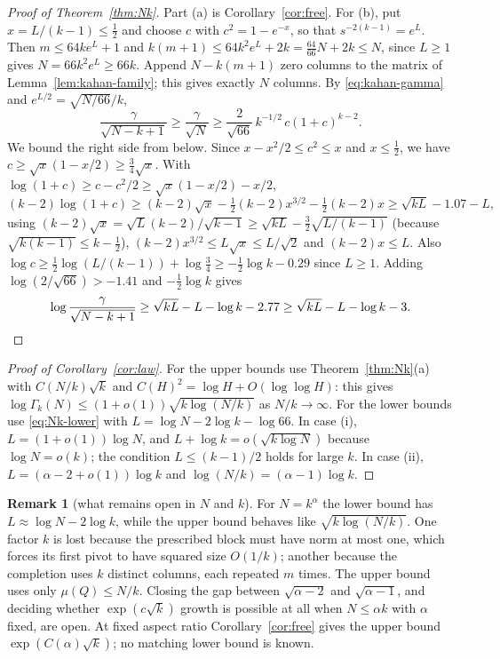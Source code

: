 \documentclass[11pt,a4paper]{article}
\theoremstyle{definition}
\newtheorem{remark}[theorem]{Remark}
\numberwithin{equation}{section}
\begin{document}
\begin{proof}[Proof of Theorem~\ref{thm:Nk}]
Part (a) is Corollary~\ref{cor:free}. For (b), put $x=L/(k-1)\le\tfrac12$ and choose $c$ with $c^2=1-e^{-x}$, so that
$s^{-2(k-1)}=e^L$. Then $m\le64ke^L+1$ and $k(m+1)\le64k^2e^L+2k=\tfrac{64}{66}N+2k\le N$, since $L\ge1$ gives $N=66k^2e^L\ge66k$. Append
$N-k(m+1)$ zero columns to the matrix of Lemma~\ref{lem:kahan-family}; this gives exactly $N$ columns. By
\eqref{eq:kahan-gamma} and $e^{L/2}=\sqrt{N/66}/k$,
\begin{equation}\label{eq:Nk-ratio}
 \frac{\gamma}{\sqrt{N-k+1}}\ge\frac{\gamma}{\sqrt N}\ge\frac2{\sqrt{66}}\,k^{-1/2}\,c(1+c)^{k-2}.
\end{equation}
We bound the right side from below. Since $x-x^2/2\le c^2\le x$ and $x\le\tfrac12$, we have
$c\ge\sqrt x(1-x/2)\ge\tfrac34\sqrt x$. With $\log(1+c)\ge c-c^2/2\ge\sqrt x(1-x/2)-x/2$,
\[
 (k-2)\log(1+c)\ge(k-2)\sqrt x-\tfrac12(k-2)x^{3/2}-\tfrac12(k-2)x\ge\sqrt{kL}-1.07-L,
\]
using $(k-2)\sqrt x=\sqrt L(k-2)/\sqrt{k-1}\ge\sqrt{kL}-\tfrac32\sqrt{L/(k-1)}$ (because $\sqrt{k(k-1)}\le k-\tfrac12$),
$(k-2)x^{3/2}\le L\sqrt x\le L/\sqrt2$ and $(k-2)x\le L$. Also $\log c\ge\tfrac12\log(L/(k-1))+\log\tfrac34
\ge-\tfrac12\log k-0.29$ since $L\ge1$. Adding $\log(2/\sqrt{66})>-1.41$ and $-\tfrac12\log k$ gives
\begin{equation}\label{eq:Nk-ineq}
 \log\frac{\gamma}{\sqrt{N-k+1}}\ge\sqrt{kL}-L-\log k-2.77\ge\sqrt{kL}-L-\log k-3. \qedhere
\end{equation}
\end{proof}

\begin{proof}[Proof of Corollary~\ref{cor:law}]
For the upper bounds use Theorem~\ref{thm:Nk}(a) with $C(N/k)\sqrt k$ and $C(H)^2=\log H+O(\log\log H)$: this gives
$\log\Gamma_k(N)\le(1+o(1))\sqrt{k\log(N/k)}$ as $N/k\to\infty$. For the lower bounds use \eqref{eq:Nk-lower} with
$L=\log N-2\log k-\log66$. In case (i), $L=(1+o(1))\log N$, and $L+\log k=o(\sqrt{k\log N})$ because
$\log N=o(k)$; the condition $L\le(k-1)/2$ holds for large $k$. In case (ii), $L=(\alpha-2+o(1))\log k$ and
$\log(N/k)=(\alpha-1)\log k$.
\end{proof}

\begin{remark}[what remains open in $N$ and $k$]\label{rem:Nk-gap}
For $N=k^\alpha$ the lower bound has $L\approx\log N-2\log k$, while the upper bound behaves like
$\sqrt{k\log(N/k)}$. One factor $k$ is lost because the prescribed block must have norm at most one, which forces its
first pivot to have squared size $O(1/k)$; another because the completion uses $k$ distinct columns, each repeated
$m$ times. The upper bound uses only $\mu(Q)\le N/k$. Closing the gap between
$\sqrt{\alpha-2}$ and $\sqrt{\alpha-1}$, and deciding whether $\exp(c\sqrt k)$ growth is possible at all when
$N\le\alpha k$ with $\alpha$ fixed, are open. At fixed aspect ratio Corollary~\ref{cor:free} gives the upper bound
$\exp(C(\alpha)\sqrt k)$; no matching lower bound is known.
\end{remark}
\end{document}
